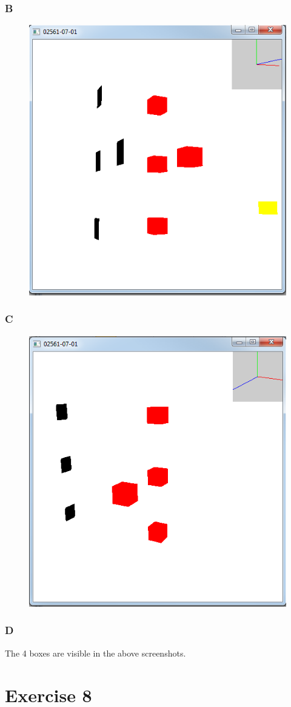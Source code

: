 \documentclass[11pt]{article}
\begin{document}
\subsubsection{B}
\begin{figure}[H]
	\centering
	\includegraphics[width=0.5\linewidth]{images/e07p1directional}
	\label{fig:e07p1directional}
\end{figure}

\subsubsection{C}
\begin{figure}[H]
	\centering
	\includegraphics[width=0.5\linewidth]{images/e07p1bigdist}
	\label{fig:e07p1bigdist}
\end{figure}

\subsubsection{D}
The 4 boxes are visible in the above screenshots.


\section{Exercise 8}
\end{document}
